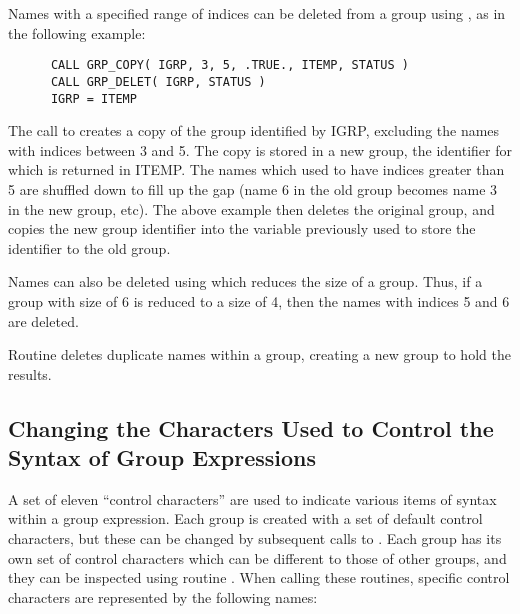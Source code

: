 Names with a specified range of indices can be deleted from a group using
, as in the following example:

\small
\begin{verbatim}
      CALL GRP_COPY( IGRP, 3, 5, .TRUE., ITEMP, STATUS )
      CALL GRP_DELET( IGRP, STATUS )
      IGRP = ITEMP
\end{verbatim}
\normalsize

The call to  creates a copy of the group identified by IGRP,
excluding the names with indices between 3 and 5. The copy is stored in a new
group, the identifier for which is returned in ITEMP. The names which used to
have indices greater than 5 are shuffled down to fill up the gap (name 6 in
the old group becomes name 3 in the new group, etc). The above example then
deletes the original group, and copies the new group identifier into the
variable previously used to store the identifier to the old group.

Names can also be deleted using  which reduces the size of a group.
Thus, if a group with size of 6 is reduced to a size of 4, then the names with
indices 5 and 6 are deleted.

Routine  deletes duplicate names within a group, creating a new group
to hold the results.

\subsection{\label{SEC:CC}Changing the Characters Used to Control the Syntax of Group
Expressions}

A set of eleven ``control characters'' are used to indicate various items of
syntax within
a group expression. Each group is created with a set of default control
characters, but these can be changed by subsequent calls to . Each
group has its own set of control characters which can be different to those of
other groups, and they can be inspected using routine
. When calling
these routines, specific control characters are represented by the following
names:

